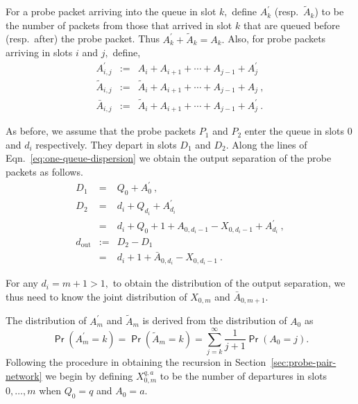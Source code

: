 \documentclass[11pt]{article}
\newcommand{\prob}[1]{\mathsf{\Pr}\left(#1\right)}
\begin{document}
For a probe packet arriving into the queue in slot $k,$ define
$A^\prime_k$ (resp.~$\tilde{A}_k$) to be the number of packets from
those that arrived in slot $k$ that are queued before (resp.~after)
the probe packet. Thus $A^\prime_k + \tilde{A}_k = A_k.$ Also, for
probe packets arriving in slots $i$ and $j,$ define,
\begin{eqnarray*}
  A_{i,j}^\prime &:=& A_i + A_{i+1} + \cdots + A_{j-1} + A^\prime_j \ \,\\
  \tilde{A}_{i,j} &:=& \tilde{A}_i + A_{i+1} + \cdots + A_{j-1} +
  A_j\ , \\
  \bar{A}_{i,j} &:=& \tilde{A}_i + A_{i+1} + \cdots + A_{j-1} +
  A^\prime_j \ . 
\end{eqnarray*}

As before, we assume that the probe packets $P_1$ and $P_2$ enter the
queue in slots $0$ and $d_i$ respectively. They depart in slots $D_1$
and $D_2$. Along the lines of Eqn.~\ref{eq:one-queue-dispersion} we
obtain the output separation of the probe packets as follows.  
\begin{eqnarray}
  D_1 &=& Q_0 + A^\prime_0 \ , \nonumber \\
  D_2 &=& d_i + Q_{d_i} + A^\prime_{d_i} \nonumber \\
      &=& d_i + Q_0 + 1 + A_{0,d_i-1} -  X_{0,d_i-1} + A_{d_i}^\prime
      \ ,  \nonumber \\  
  d_{\mathrm{out}} &:=& D_2 - D_1 \nonumber \\
  &=& d_i + 1 + \bar{A}_{0,d_i} - X_{0,d_i-1}  \ . 
  \label{eq:general-dispersion}
\end{eqnarray}


For any $d_i=m+1 > 1,$ to obtain the distribution of the output
separation, we thus need to know the joint distribution of $X_{0,m}$
and $\bar{A}_{0,m+1}.$

The distribution of $A_m^\prime$ and $\tilde{A}_m$ is derived from the
distribution of $A_0$ as
\begin{displaymath}
  \prob{A^\prime_m=k} = \prob{\tilde{A}_m=k}  = \sum_{j=k}^\infty
  \frac{1}{j+1} \prob{A_0=j}.  
\end{displaymath}
Following the procedure in obtaining the recursion in
Section~\ref{sec:probe-pair-network} we begin by defining
$X_{0,m}^{q,a}$ to be the number of departures in slots $0,\ldots,m$
when $Q_0=q$ and $A_0=a.$ 
\end{document}
